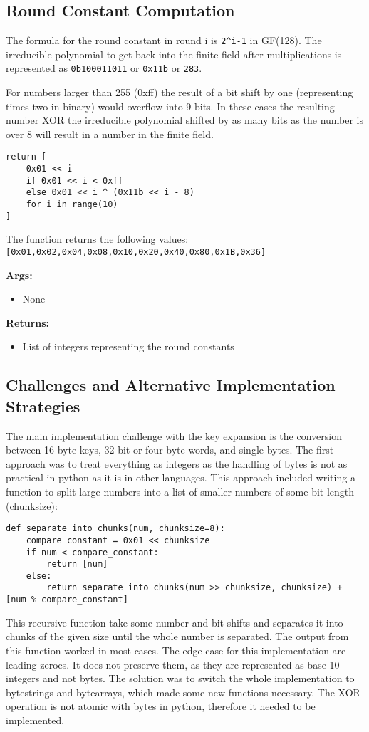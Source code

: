 \subsection{Round Constant Computation}
The formula for the round constant in round i is  \lstinline{2^i-1} in GF(128). The irreducible polynomial to get back into the finite field after multiplications is represented as  \lstinline{0b100011011} or  \lstinline{0x11b} or  \lstinline{283}.

For numbers larger than 255 (0xff) the result of a bit shift by one (representing times two in binary) would overflow into 9-bits. In these cases the resulting number XOR the irreducible polynomial shifted by as many bits as the number is over 8 will result in a number in the finite field.

\begin{lstlisting}
return [
    0x01 << i
    if 0x01 << i < 0xff
    else 0x01 << i ^ (0x11b << i - 8)
    for i in range(10)
]
\end{lstlisting}

The function returns the following values:
 \lstinline{[0x01,0x02,0x04,0x08,0x10,0x20,0x40,0x80,0x1B,0x36]}

\textbf{Args:}
\begin{itemize}
  \item None
\end{itemize}

\textbf{Returns:}
\begin{itemize}
  \item List of integers representing the round constants
\end{itemize}

\subsection{Challenges and Alternative Implementation Strategies}
The main implementation challenge with the key expansion is the conversion between 16-byte keys, 32-bit or four-byte words, and single bytes. The first approach was to treat everything as integers as the handling of bytes is not as practical in python as it is in other languages. This approach included writing a function to split large numbers into a list of smaller numbers of some bit-length (chunksize):
\begin{lstlisting}
def separate_into_chunks(num, chunksize=8):
    compare_constant = 0x01 << chunksize
    if num < compare_constant:
        return [num]
    else:
        return separate_into_chunks(num >> chunksize, chunksize) + [num % compare_constant]
\end{lstlisting}
This recursive function take some number and bit shifts and separates it into chunks of the given size until the whole number is separated. The output from this function worked in most cases. The edge case for this implementation are leading zeroes. It does not preserve them, as they are represented as base-10 integers and not bytes. The solution was to switch the whole implementation to bytestrings and bytearrays, which made some new functions necessary. The XOR operation is not atomic with bytes in python, therefore it needed to be implemented.


